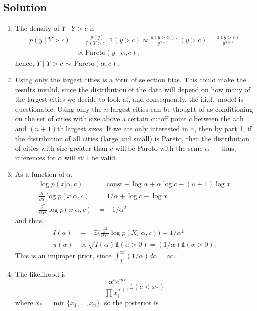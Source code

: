 \documentclass[11pt]{article}
\newcommand{\Pareto}{\mathrm{Pareto}}
\newcommand{\I}{\mathds{1}}
\begin{document}
\newpage
\subsection*{Solution}

\begin{enumerate}
\item The density of $Y\mid Y>c$ is
\begin{align*}
p(y\mid Y>c) &= \frac{p(y)}{\mathds{P}(Y>c)}\I(y>c) \propto \frac{\I(y>c_0)}{y^{\alpha +1}}\I(y>c) = \frac{\I(y>c)}{y^{\alpha +1}}\\
&\propto \Pareto(y\mid \alpha, c),
\end{align*}
hence, $Y\mid Y>c \,\sim\,\Pareto(\alpha,c)$.
\item Using only the largest cities is a form of selection bias. This could make the results invalid, since the distribution of the data will depend on how many of the largest cities we decide to look at, and consequently, the i.i.d.\ model is questionable. Using only the $n$ largest cities can be thought of as conditioning on the set of cities with size above a certain cutoff point $c$ between the $n$th and $(n+1)$th largest sizes. If we are only interested in $\alpha$, then by part 1, if the distribution of all cities (large and small) is Pareto, then the distribution of cities with size greater than $c$ will be Pareto with the same $\alpha$ --- thus, inferences for $\alpha$ will still be valid.
\item As a function of $\alpha$,
\begin{align*}
\log p(x|\alpha,c) &= \mathrm{const} + \log\alpha +\alpha\log c - (\alpha +1)\log x\\
\textstyle\frac{\partial}{\partial\alpha}\log p(x|\alpha,c) &= 1/\alpha + \log c - \log x\\
\textstyle\frac{\partial^2}{\partial\alpha^2}\log p(x|\alpha,c) &= -1/\alpha^2
\end{align*}
and thus,
\begin{align*}
I(\alpha) &= -\mathds{E}\big(\textstyle\frac{\partial^2}{\partial\alpha^2}\log p(X_i|\alpha,c)\big) = 1/\alpha^2\\
\pi(\alpha) &\propto \sqrt{I(\alpha)}\I(\alpha>0) = (1/\alpha)\I(\alpha>0).
\end{align*}
This is an improper prior, since $\int_0^\infty (1/\alpha) d\alpha = \infty$.
\item The likelihood is
$$ \frac{\alpha^n c^{n\alpha}}{\prod x_i^{\alpha+1}}\I(c<x_*) $$
where $x_* = \min\{x_1,\ldots,x_n\}$, so the posterior is

\end{enumerate}
\end{document}
